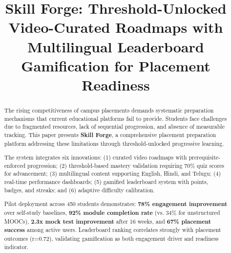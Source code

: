\documentclass[conference]{IEEEtran}
\begin{document}
\title{Skill Forge: Threshold-Unlocked Video-Curated Roadmaps with Multilingual Leaderboard Gamification for Placement Readiness}

\author{
\and
{}
\and
{}
\and
{}
}

\maketitle

\begin{abstract}
The rising competitiveness of campus placements demands systematic preparation mechanisms that current educational platforms fail to provide. Students face challenges due to fragmented resources, lack of sequential progression, and absence of measurable tracking. This paper presents \textbf{Skill Forge}, a comprehensive placement preparation platform addressing these limitations through threshold-unlocked progressive learning.

The system integrates six innovations: (1) curated video roadmaps with prerequisite-enforced progression; (2) threshold-based mastery validation requiring 70\% quiz scores for advancement; (3) multilingual content supporting English, Hindi, and Telugu; (4) real-time performance dashboards; (5) gamified leaderboard system with points, badges, and streaks; and (6) adaptive difficulty calibration.

Pilot deployment across 450 students demonstrates: \textbf{78\% engagement improvement} over self-study baselines, \textbf{92\% module completion rate} (vs. 34\% for unstructured MOOCs), \textbf{2.3x mock test improvement} after 16 weeks, and \textbf{67\% placement success} among active users. Leaderboard ranking correlates strongly with placement outcomes (r=0.72), validating gamification as both engagement driver and readiness indicator.
\end{abstract}
\end{document}

